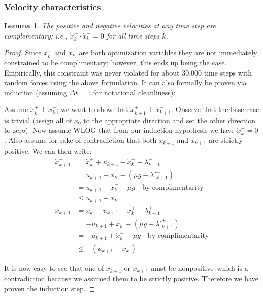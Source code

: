 \documentclass{article}
\newtheorem{lemma}[theorem]{Lemma}
\begin{document}
\subsubsection{Velocity characteristics}
\begin{lemma}
    The positive and negative velocities at any time step are complementary; i.e., $\dot x^+_k \cdot \dot x^-_k = 0$ for all time steps $k$.
\end{lemma}
\begin{proof}
Since $\dot x^+_k$ and $\dot x^-_k$ are both optimization variables they are not immediately constrained to be complimentary; however, this ends up being the case. Empirically, this constraint was never violated for about 30,000 time steps with random forces using the above formulation.  It can also formally be proven via induction (assuming $\Delta t = 1$ for notational cleanliness):

Assume $\dot x^+_k \perp \dot x^-_k$; we want to show that $\dot x^+_{k+1} \perp \dot x^-_{k+1}$. Observe that the base case is trivial (assign all of $\dot x_0$ to the appropriate direction and set the other direction to zero). Now assume WLOG that from our induction hypothesis we have $\dot x^+_k = 0$. Also assume for sake of contradiction that both $\dot x^+_{k+1}$ and $\dot x^-_{k+1}$ are strictly positive. We can then write:
\begin{align*}
    \dot x^+_{k+1} &= \dot x^+_k + u_{k+1} - \dot x^-_{k} - \lambda^-_{k+1} \\
                   &= u_{k+1} - \dot x^-_k - (\mu g - \lambda'^-_{k+1}) \\
                   &= u_{k+1} - \dot x^-_k - \mu g \quad \textrm{by complimentarity}\\
                   &\leq u_{k+1} - \dot x^-_k\\
    \dot x^-_{k+1} &= \dot x^-_k - u_{k+1} - \dot x^+_{k} - \lambda^+_{k+1} \\
                   &= -u_{k+1} + \dot x^- _k - (\mu g - \lambda'^+_{k+1}) \\
                   &= -u_{k+1} + \dot x^- _k - \mu g \quad \textrm{by complimentarity} \\
                   &\leq -(u_{k+1} - \dot x^-_k)
\end{align*}

It is now easy to see that one of $\dot x^+_{k+1}$ or $\dot x^-_{k+1}$ must be nonpositive--which is a contradiction because we assumed them to be strictly positive. Therefore we have proven the induction step.
\end{proof}
\end{document}
